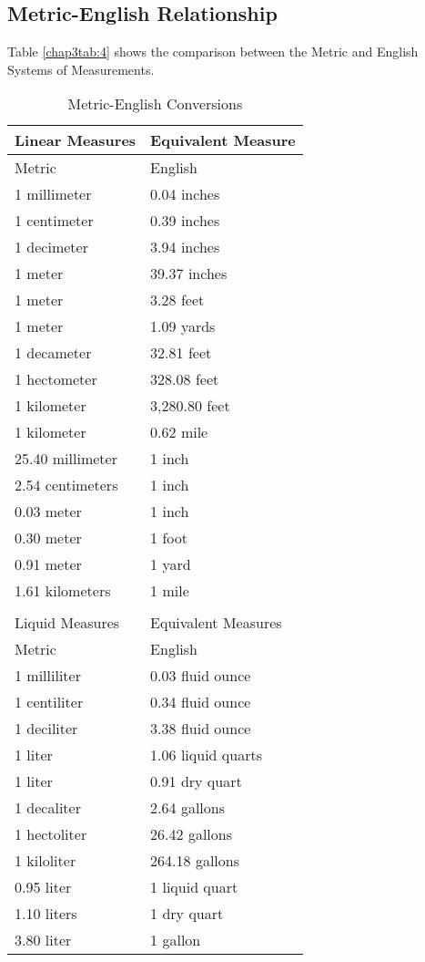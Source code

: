 \subsection*{Metric-English Relationship}
Table \eqref{chap3tab:4} shows the comparison between the Metric and English Systems of
Measurements.
\begin{table}[!h]
\centering
\caption{Metric-English Conversions}
\begin{tabular}{ll}
\hline \hline
Linear Measures &Equivalent Measure\\
\hline
Metric & English\\
1 millimeter & 0.04 inches\\
1 centimeter & 0.39 inches\\
1 decimeter & 3.94 inches\\
1 meter & 39.37 inches\\
1 meter & 3.28 feet\\
1 meter & 1.09 yards\\
1 decameter & 32.81 feet\\
1 hectometer & 328.08 feet\\
1 kilometer & 3,280.80 feet\\
1 kilometer & 0.62 mile\\
25.40 millimeter & 1 inch\\
2.54 centimeters & 1 inch\\
0.03 meter & 1 inch\\
0.30 meter & 1 foot\\
0.91 meter & 1 yard\\
1.61 kilometers & 1 mile\\
\hline
 & \\
\hline \hline
Liquid Measures & Equivalent Measures\\
\hline
Metric &English\\
1 milliliter & 0.03 fluid ounce\\
1 centiliter &0.34 fluid ounce\\
1 deciliter &3.38 fluid ounce\\
1 liter &1.06 liquid quarts\\
1 liter &0.91 dry quart\\
1 decaliter &2.64 gallons\\
1 hectoliter &26.42 gallons\\
1 kiloliter &264.18 gallons\\
0.95 liter &1 liquid quart\\
1.10 liters &1 dry quart\\
3.80 liter &1 gallon\\

\end{tabular}
\end{table}
